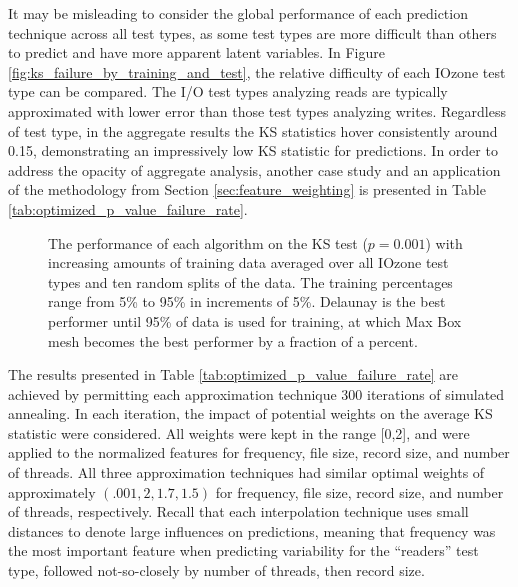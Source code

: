 \documentclass[letterpaper, 10 pt, conference]{ieeeconf}  %
\begin{document}
It may be misleading to consider the global performance of each prediction technique across all test types, as some test types are more difficult than others to predict and have more apparent latent variables. In Figure \ref{fig:ks_failure_by_training_and_test}, the relative difficulty of each IOzone test type can be compared. The I/O test types analyzing reads are typically approximated with lower error than those test types analyzing writes. Regardless of test type, in the aggregate results the KS statistics hover consistently around 0.15, demonstrating an impressively low KS statistic for predictions. In order to address the opacity of aggregate analysis, another case study and an application of the methodology from Section \ref{sec:feature_weighting} is presented in Table \ref{tab:optimized_p_value_failure_rate}.

\begin{figure}
  \caption{The performance of each algorithm on the KS test ($p=0.001$) with increasing amounts of training data averaged over all IOzone test types and ten random splits of the data. The training percentages range from 5\% to 95\% in increments of 5\%. Delaunay is the best performer until 95\% of data is used for training, at which Max Box mesh becomes the best performer by a fraction of a percent.
  \vspace{-.1cm}}
  \label{fig:ks_failure_by_training}
\end{figure}

The results presented in Table \ref{tab:optimized_p_value_failure_rate} are achieved by permitting each approximation technique 300 iterations of simulated annealing. In each iteration, the impact of potential weights on the average KS statistic were considered. All weights were kept in the range [0,2], and were applied to the normalized features for frequency, file size, record size, and number of threads. All three approximation techniques had similar optimal weights of approximately $(.001, 2, 1.7, 1.5)$ for frequency, file size, record size, and number of threads, respectively. Recall that each interpolation technique uses small distances to denote large influences on predictions, meaning that frequency was the most important feature when predicting variability for the ``readers'' test type, followed not-so-closely by number of threads, then record size.
\end{document}
